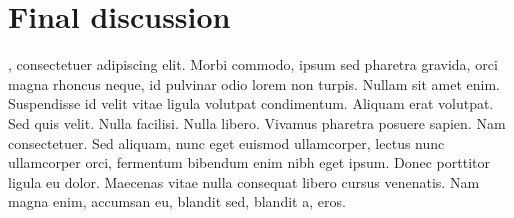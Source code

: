 \graphicspath{{figures/chapter6/}}
\onehalfspacing

\chapter{Final discussion}\label{ch:6}

, consectetuer adipiscing elit. Morbi commodo,
ipsum sed pharetra gravida, orci magna rhoncus neque, id pulvinar odio lorem non turpis.
Nullam sit amet enim. Suspendisse id velit vitae ligula volutpat condimentum. Aliquam
erat volutpat. Sed quis velit. Nulla facilisi. Nulla libero. Vivamus pharetra posuere
sapien. Nam consectetuer. Sed aliquam, nunc eget euismod ullamcorper, lectus nunc
ullamcorper orci, fermentum bibendum enim nibh eget ipsum. Donec porttitor ligula eu
dolor. Maecenas vitae nulla consequat libero cursus venenatis. Nam magna enim, accumsan
eu, blandit sed, blandit a, eros.